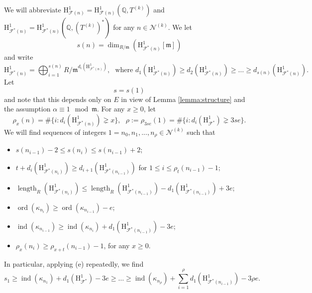 \documentclass[10pt,reqno]{amsart}
\numberwithin{equation}{section}
\theoremstyle{plain}
\theoremstyle{definition}
\theoremstyle{definition}
\theoremstyle{plain}
\theoremstyle{plain}
\theoremstyle{plain}
\theoremstyle{plain}
\theoremstyle{plain}
\theoremstyle{plain}
\DeclareMathOperator{\ord}{ord}
\newcommand{\ind}{\operatorname{ind}}
\newcommand{\Q}{\mathbb{Q}}
\DeclareMathOperator{\length}{length}
\newcommand{\Fcal}{\mathcal{F}}
\newcommand{\cN}{\mathcal{N}}
\newcommand{\fm}{\mathfrak{m}}
\newcommand{\rH}{\mathrm{H}}
\begin{document}
We will abbreviate $\rH^1_{\Fcal(n)}=\rH^1_{\Fcal(n)}(\Q,T^{(k)})$ and $\rH^1_{\Fcal^*(n)}=\rH^1_{\Fcal^*(n)}(\Q,(T^{(k)})^*)$ for any $n\in \cN^{(k)}$. 
We let 
\[
s(n)=\dim_{R/\fm}(\rH^1_{\Fcal^*(n)}[\fm])
\]
and write
\[
\rH^1_{\Fcal^*(n)} = \bigoplus_{i=1}^{s(n)}R/\fm^{d_i(\rH^1_{\Fcal^*(n)})}, \ \ \ \text{where } d_1(\rH^1_{\Fcal^*(n)})\geq d_2(\rH^1_{\Fcal^*(n)})\geq \dots\geq d_{s(n)}(\rH^1_{\Fcal^*(n)}).
\]
Let 
\[
s=s(1)
\]
 and note that this depends only on $E$ in view of Lemma \ref{lemma:structure} and the assumption $\alpha\equiv 1 \mod \fm$. For any $x\geq 0$, let 
\[
\rho_{x}(n)= \# \{ i: d_i(\rH^1_{\Fcal^*(n)})\gneq x\}, \ \ \ \rho:=\rho_{3se}(1)= \# \{ i: d_i(\rH^1_{\Fcal^*})\gneq 3s e\}.
\]
We will find sequences of integers $1=n_0, n_1,..., n_{\rho} \in \cN^{(k)}$ such that
\begin{itemize}
\item[(a)] $s(n_{i-1})-2 \leq s(n_{i})\leq s(n_{i-1})+2$;
\item[(b)] $t+ d_i(\rH^1_{\Fcal^*(n_{i})}) \geq d_{i+1}(\rH^1_{\Fcal^*(n_{i-1})})$ for $1\leq i \leq \rho_t(n_{i-1})-1$;
\item[(c)] $\length_{R}(\rH^1_{\Fcal^*(n_i)})\leq \length_{R}(\rH^1_{\Fcal^*(n_{i-1})})- d_{1}(\rH^1_{\Fcal^*(n_{i-1})}) +3e$;
\item[(d)] $\ord(\kappa_{n_i})\geq \ord(\kappa_{n_{i-1}})-e$;
\item[(e)] $\ind(\kappa_{n_{i-1}})\geq \ind(\kappa_{n_i})+d_{1}(\rH^1_{\Fcal^*(n_{i-1})}) -3e$;
\item[(f)] $\rho_{x}(n_i)\geq \rho_{x+t}(n_{i-1}) -1$, for any $x\geq 0$.
\end{itemize}
In particular, applying (e) repeatedly, we find
\begin{equation}\label{eq:repeatE}
s_1 \geq \ind(\kappa_{n_1})+d_{1}(\rH^1_{\Fcal^*})-3e\geq \dots \geq \ind(\kappa_{n_{\rho}})+\sum_{i=1}^{\rho}d_{1}(\rH^1_{\Fcal^*(n_{i-1})})-3\rho e.
\end{equation}
\end{document}
